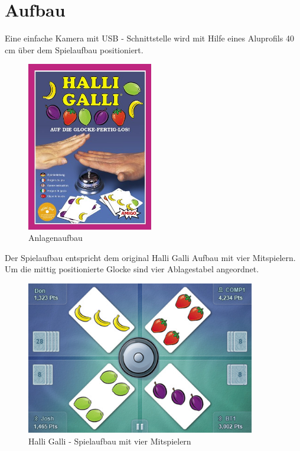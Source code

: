 
\section{Aufbau}
\label{sec:Kapitel}

Eine einfache Kamera mit USB - Schnittstelle wird mit Hilfe eines Aluprofils 40 cm über dem Spielaufbau positioniert.

\begin{figure}[]
    \centering
    \includegraphics[width=5.5cm]{Abbildungen/cover}
    \caption[Anlage]{Anlagenaufbau}
    \label{fig:Anlage}
\end{figure}

Der Spielaufbau entspricht dem original Halli Galli Aufbau mit vier Mitspielern. Um die mittig positionierte Glocke sind vier Ablagestabel angeordnet. 

\begin{figure}[h]
    \centering
    \includegraphics[width=10cm]{Abbildungen/Aufbau}
    \caption[Spielaufbau]{Halli Galli - Spielaufbau mit vier Mitspielern}
    \label{fig:Spielaufbau}
\end{figure}

